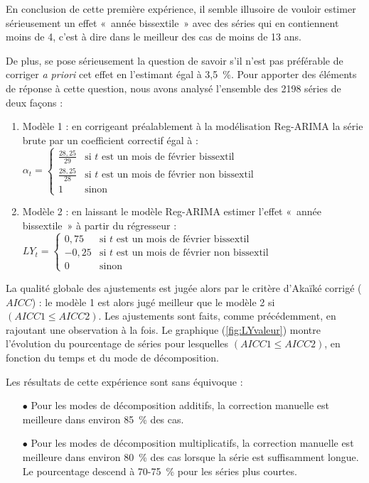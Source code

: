 \documentclass[12pt, a4paper, french]{article}
\begin{document}
\clearpage

En conclusion de cette première expérience, il semble illusoire de vouloir estimer sérieusement un effet «~année bissextile~» avec des séries qui en contiennent moins de 4, c'est à dire dans le meilleur des cas de moins de 13 ans.

De plus, se pose sérieusement la question de savoir s'il n'est pas préférable de corriger \emph{a priori} cet effet en l'estimant égal à 3,5~\%. Pour apporter des éléments de réponse à cette question, nous avons analysé l'ensemble des 2198 séries de deux façons :
\begin{enumerate}
	\item Modèle 1 : en corrigeant préalablement à la modélisation Reg-ARIMA la série brute par un coefficient correctif égal à :
$
\alpha_{t} = \left\{ \begin{array}{rl} 
                \frac{28,25}{29} & \mbox{si } t \mbox{ est un mois de février bissextil } \\
                \frac{28,25}{28} & \mbox{si } t \mbox{ est un mois de février non bissextil } \\
                1 & \mbox{sinon}
               \end{array}
         \right.
$
  \item Modèle 2 : en laissant le modèle Reg-ARIMA estimer l'effet «~année bissextile~» à partir du régresseur : $
LY_{t} = \left\{ \begin{array}{rl} 
                0,75 & \mbox{si } t \mbox{ est un mois de février bissextil } \\
                -0,25 & \mbox{si } t \mbox{ est un mois de février non bissextil } \\
                0 & \mbox{sinon}
               \end{array}
         \right.
$
\end{enumerate}

La qualité globale des ajustements est jugée alors par le critère d'Akaïké corrigé ($AICC$) : le modèle 1 est alors jugé meilleur que le modèle 2 si $(AICC1 \le AICC2)$. Les ajustements sont faits, comme précédemment, en rajoutant une observation à la fois.
Le graphique (\ref{fig:LYvaleur}) montre l'évolution du pourcentage de séries pour lesquelles $(AICC1 \le AICC2)$, en fonction du temps et du mode de décomposition.

Les résultats de cette expérience sont sans équivoque : 
\begin{itemize}
	\item [$\bullet$] Pour les modes de décomposition additifs, la correction manuelle est meilleure dans environ 85~\% des cas.
	\item [$\bullet$] Pour les modes de décomposition multiplicatifs, la correction manuelle est meilleure dans environ 80~\% des cas lorsque la série est suffisamment longue. Le pourcentage descend à 70-75~\% pour les séries plus courtes.
\end{itemize}
\end{document}
